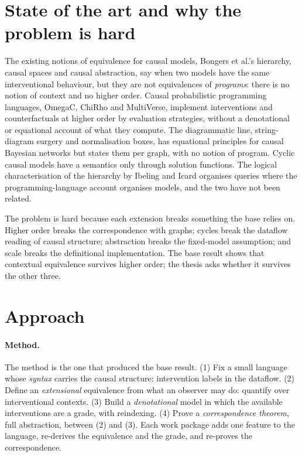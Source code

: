 \section{State of the art and why the problem is hard}

The existing notions of equivalence for causal models, Bongers et al.'s hierarchy, causal spaces and causal abstraction, say when two models have the same interventional behaviour, but they are not equivalences of \emph{programs}: there is no notion of context and no higher order. Causal probabilistic programming languages, OmegaC, ChiRho and MultiVerse, implement interventions and counterfactuals at higher order by evaluation strategies, without a denotational or equational account of what they compute. The diagrammatic line, string-diagram surgery and normalisation boxes, has equational principles for causal Bayesian networks but states them per graph, with no notion of program. Cyclic causal models have a semantics only through solution functions. The logical characterisation of the hierarchy by Ibeling and Icard organises queries where the programming-language account organises models, and the two have not been related.

The problem is hard because each extension breaks something the base relies on. Higher order breaks the correspondence with graphs; cycles break the dataflow reading of causal structure; abstraction breaks the fixed-model assumption; and scale breaks the definitional implementation. The base result shows that contextual equivalence survives higher order; the thesis asks whether it survives the other three.

\section{Approach}\label{sec:approach}

\paragraph{Method.} The method is the one that produced the base result. (1) Fix a small language whose \emph{syntax} carries the causal structure: intervention labels in the dataflow. (2) Define an \emph{extensional} equivalence from what an observer may do: quantify over interventional contexts. (3) Build a \emph{denotational} model in which the available interventions are a grade, with reindexing. (4) Prove a \emph{correspondence theorem}, full abstraction, between (2) and (3). Each work package adds one feature to the language, re-derives the equivalence and the grade, and re-proves the correspondence.

